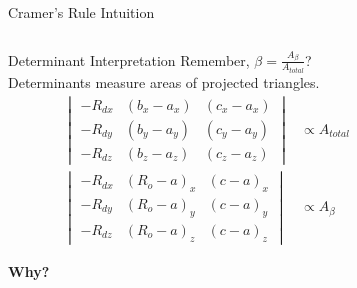 {
    \begin{frame}{Cramer's Rule Intuition}
        \begin{columns}
            \begin{column}{0.65\textwidth}
                \begin{mathbox}{Determinant Interpretation}
                    Remember, $\beta = \frac{A_{\beta}}{A_{total}}$? \\

                    Determinants measure areas of projected triangles.
                    \begin{align*}
                        \begin{vmatrix}
                            -R_{dx} & (b_x-a_x) & (c_x-a_x) \\
                            -R_{dy} & (b_y-a_y) & (c_y-a_y) \\
                            -R_{dz} & (b_z-a_z) & (c_z-a_z)
                        \end{vmatrix} &\propto A_{total} \\
                        \begin{vmatrix}
                            -R_{dx} & (R_o-a)_x & (c-a)_x \\
                            -R_{dy} & (R_o-a)_y & (c-a)_y \\
                            -R_{dz} & (R_o-a)_z & (c-a)_z
                        \end{vmatrix} &\propto A_{\beta}
                    \end{align*}
                    
                    \textbf{Why?}
                \end{mathbox}
                
            \end{column}
            \begin{column}{0.35\textwidth}
                \centering
\end{column}
\end{columns}
\end{frame}}
